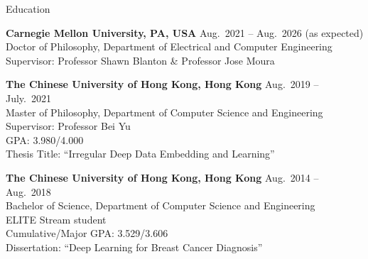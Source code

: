 

\begin{rSection}{Education}

{\bf Carnegie Mellon University, PA, USA} \hfill {Aug.~2021 -- Aug.~2026 (as expected)} \\ 
Doctor of Philosophy, Department of Electrical and Computer Engineering  \\
Supervisor: Professor Shawn Blanton \& Professor Jose Moura 

{\bf The Chinese University of Hong Kong, Hong Kong} \hfill {Aug.~2019 -- July.~2021} \\ 
Master of Philosophy, Department of Computer Science and Engineering \\
Supervisor: Professor Bei Yu \\
GPA: 3.980/4.000 \\
Thesis Title: ``Irregular Deep Data Embedding and Learning''

{\bf The Chinese University of Hong Kong, Hong Kong} \hfill {Aug.~2014 -- Aug.~2018} \\ 
Bachelor of Science, Department of Computer Science and Engineering \\
ELITE Stream student \\
Cumulative/Major GPA: 3.529/3.606 \\
Dissertation: ``Deep Learning for Breast Cancer Diagnosis'' \\ 
\end{rSection}




